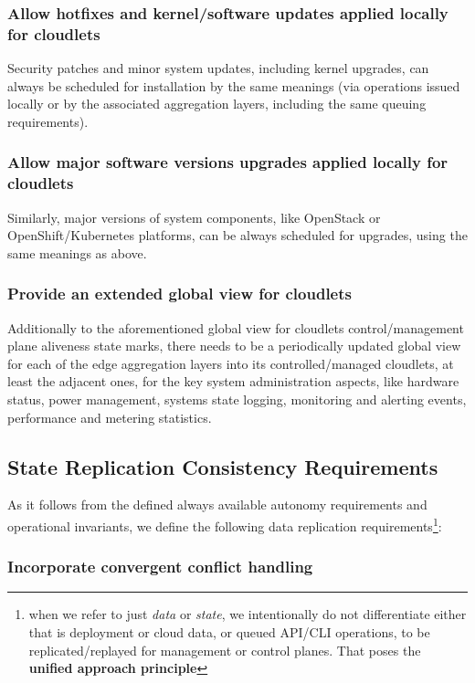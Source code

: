 \documentclass[conference]{IEEEtran}
\begin{document}
\subsubsection{Allow hotfixes and kernel/software updates applied locally for
cloudlets}

Security patches and minor system updates, including kernel upgrades, can
always be scheduled for installation by the same meanings (via operations
issued locally or by the associated aggregation layers, including the same
queuing requirements).

\subsubsection{Allow major software versions upgrades applied locally for
cloudlets}

Similarly, major versions of system components, like OpenStack or
OpenShift/Kubernetes platforms, can be always scheduled for upgrades, using the
same meanings as above.

\subsubsection{Provide an extended global view for cloudlets}

Additionally to the aforementioned global view for cloudlets control/management
plane aliveness state marks, there needs to be a periodically updated global
view for each of the edge aggregation layers into its controlled/managed
cloudlets, at least the adjacent ones, for the key system administration
aspects, like hardware status, power management, systems state logging,
monitoring and alerting events, performance and metering statistics.

\subsection{State Replication Consistency Requirements}

As it follows from the defined always available autonomy requirements and
operational invariants, we define the following data replication
requirements\footnote{when we refer to just \textit{data} or \textit{state}, we
intentionally do not differentiate either that is deployment or cloud data, or
queued API/CLI operations, to be replicated/replayed for management or control
planes. That poses the \textbf{unified approach principle}}:

\subsubsection{Incorporate convergent conflict handling\cite{b1}}
\end{document}
